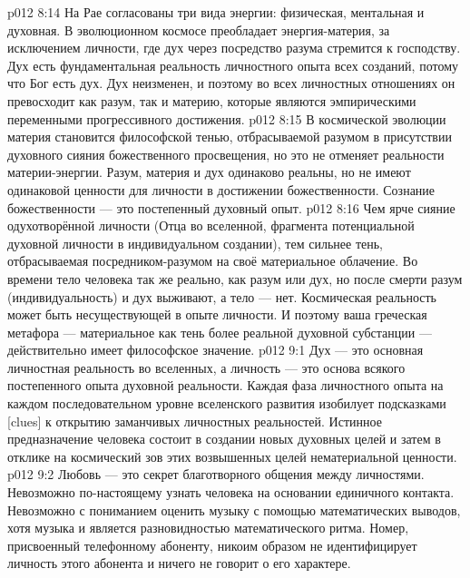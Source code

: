 \vs p012 8:14 \pc На Рае согласованы три вида энергии: физическая, ментальная и духовная. В эволюционном космосе преобладает энергия\hyp{}материя, за исключением личности, где дух через посредство разума стремится к господству. Дух есть фундаментальная реальность личностного опыта всех созданий, потому что Бог есть дух. Дух неизменен, и поэтому во всех личностных отношениях он превосходит как разум, так и материю, которые являются эмпирическими переменными прогрессивного достижения.
\vs p012 8:15 В космической эволюции материя становится философской тенью, отбрасываемой разумом в присутствии духовного сияния божественного просвещения, но это не отменяет реальности материи\hyp{}энергии. Разум, материя и дух одинаково реальны, но не имеют одинаковой ценности для личности в достижении божественности. Сознание божественности --- это постепенный духовный опыт.
\vs p012 8:16 Чем ярче сияние одухотворённой личности (Отца во вселенной, фрагмента потенциальной духовной личности в индивидуальном создании), тем сильнее тень, отбрасываемая посредником\hyp{}разумом на своё материальное облачение. Во времени тело человека так же реально, как разум или дух, но после смерти разум (индивидуальность) и дух выживают, а тело --- нет. Космическая реальность может быть несуществующей в опыте личности. И поэтому ваша греческая метафора --- материальное как тень более реальной духовной субстанции --- действительно имеет философское значение.
\vs p012 9:1 Дух --- это основная личностная реальность во вселенных, а личность --- это основа всякого постепенного опыта духовной реальности. Каждая фаза личностного опыта на каждом последовательном уровне вселенского развития изобилует подсказками [clues] к открытию заманчивых личностных реальностей. Истинное предназначение человека состоит в создании новых духовных целей и затем в отклике на космический зов этих возвышенных целей нематериальной ценности.
\vs p012 9:2 \pc Любовь --- это секрет благотворного общения между личностями. Невозможно по\hyp{}настоящему узнать человека на основании единичного контакта. Невозможно с пониманием оценить музыку с помощью математических выводов, хотя музыка и является разновидностью математического ритма. Номер, присвоенный телефонному абоненту, никоим образом не идентифицирует личность этого абонента и ничего не говорит о его характере.
